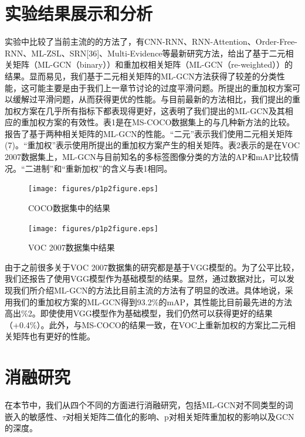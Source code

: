 \section{实验结果展示和分析}
实验中比较了当前主流的的方法了，有CNN-RNN\cite{Jiang2016CNN}、RNN-Attention、Order-Free-RNN\cite{Chen2017Order}、ML-ZSL\cite{Li2015Leveraging}、SRN[36]、Multi-Evidence\cite{Clare2002Knowledge}等最新研究方法，给出了基于二元相关矩阵（ML-GCN（binary））和重加权相关矩阵（ML-GCN（re-weighted））的结果。显而易见，我们基于二元相关矩阵的ML-GCN方法获得了较差的分类性能，这可能主要是由于我们上一章节讨论的过度平滑问题。所提出的重加权方案可以缓解过平滑问题，从而获得更优的性能。与目前最新的方法相比，我们提出的重加权方案在几乎所有指标下都表现得更好，这表明了我们提出的ML-GCN及其相应的重加权方案的有效性。表1是在MS-COCO数据集上的与几种新方法的比较。报告了基于两种相关矩阵的ML-GCN的性能。“二元”表示我们使用二元相关矩阵(7)。“重加权”表示使用所提出的重加权方案产生的相关矩阵。表2表示的是在VOC 2007数据集上，ML-GCN与目前知名的多标签图像分类的方法的AP和mAP比较情况。“二进制”和“重新加权”的含义与表1相同。

\begin{figure}[htbp!]
	\centering
	\texttt{[image: figures/p1p2figure.eps]}
	\caption{COCO数据集中的结果}\label{fig:simuP1P2Result}
	\vspace{-1em}
\end{figure}

\begin{figure}[htbp!]
	\centering
	\texttt{[image: figures/p1p2figure.eps]}
	\caption{VOC 2007数据集中结果}\label{fig:simuP1P2Result}
	\vspace{-1em}
\end{figure}

由于之前很多关于VOC 2007数据集的研究都是基于VGG模型的\cite{Li2014Multi}。为了公平比较，我们还报告了使用VGG模型作为基础模型的结果。显然，通过数据对比，可以发现我们所介绍ML-GCN的方法比目前主流的方法有了明显的改进。具体地说，采用我们的重加权方案的ML-GCN得到93.2\%的mAP，其性能比目前最先进的方法高出\%2。即使使用VGG模型作为基础模型，我们仍然可以获得更好的结果（+0.4\%）。此外，与MS-COCO的结果一致，在VOC上重新加权的方案比二元相关矩阵也有更好的性能。

\section{消融研究}
在本节中，我们从四个不同的方面进行消融研究，包括ML-GCN对不同类型的词嵌入的敏感性、$\tau$对相关矩阵二值化的影响、p对相关矩阵重加权的影响以及GCN的深度。

